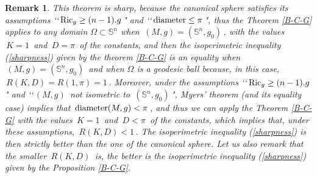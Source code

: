 \documentclass[11pt, reqno]{amsart}
\newtheorem{remarque}[theoreme]{Remark}
\theoremstyle{plain}
\begin{document}
\begin{remarque}\rm
This theorem is sharp, because the canonical sphere satisfies its assumptions 
\lq \lq $\,{\rm Ric}_g \ge (n-1).g\,$" and \lq \lq $\, {\rm diameter} \le \pi \,$",
 thus the Theorem \ref{B-C-G} applies to any domain $\Omega \subset \mathbb S^n$ when $\, (M, g) = (\mathbb S^n , g_0 )\,$, with the values
$\,K = 1\,$ and $\, D = \pi\,$ of the constants, and then the isoperimetric inequality (\ref{sharpness}) 
given by the theorem \ref{B-C-G} is an equality when $\, (M, g) = (\mathbb S^n , g_0 )\,$ and when $\Omega$ is a geodesic ball because, in this case, $\, R(K , D) = R(1, \pi) = 1\,$.
Moreover, under the assumptions \lq \lq $\,{\rm Ric}_g \ge (n-1).g\,$" and 
\lq \lq $\, (M, g) \,$ not isometric to $\,(\mathbb S^n , g_0 )\,$", Myers' theorem (and its equality case)
implies that $\,{\rm diameter} (M,g) < \pi\,$, and thus we can apply the Theorem \ref{B-C-G} 
with the values $\,K = 1\,$ and $\, D < \pi\,$ of the constants, which implies that, under these assumptions,
$\,R(K,D) < 1\,$. The isoperimetric inequality (\ref{sharpness}) is then strictly better than the one
of the canonical sphere.
Let us also remark that the smaller $\,R(K , D)\,$ is, the better is the isoperimetric 
inequality (\ref{sharpness}) given by the Proposition \ref{B-C-G}.
\end{remarque}
\end{document}
